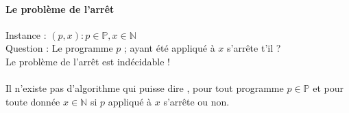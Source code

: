 \documentclass[base.tex]{subfiles}
\begin{document}
\paragraph{Le problème de l'arrêt}
Instance : $(p,x):p\in \mathbb{P} , x\in \mathbb{N}$\\
Question : Le programme $p$ ; ayant été appliqué à $x$ s'arrête t'il ?\\
Le problème de l'arrêt est indécidable !\\
\\
Il n'existe pas d'algorithme qui puisse dire , pour tout programme $p\in\mathbb{P}$ et pour toute donnée $x\in\mathbb{N}$ si $p$ appliqué à $x$ s'arrête ou non.
\end{document}
